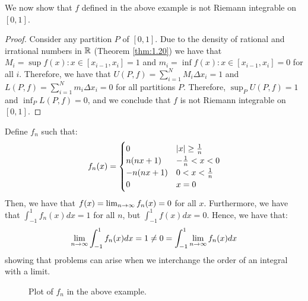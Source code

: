 \noindent We now show that $f$ defined in the above example is not Riemann integrable on $[0, 1]$.

\begin{proof}
    Consider any partition $P$ of $[0, 1]$. Due to the density of rational and irrational numbers in $\mathbb{R}$ (Theorem \ref{thm:1.20}) we have that $M_i = \sup{f(x): x \in [x_{i-1}, x_i]} = 1$ and $m_i = \inf{f(x): x \in [x_{i-1}, x_i]} = 0$ for all $i$. Therefore, we have that $U(P, f) = \sum_{i=1}^N M_i \Delta x_i = 1$ and $L(P, f) = \sum_{i=1}^N m_i \Delta x_i = 0$ for all partitions $P$. Therefore, $\sup_P U(P, f) = 1$ and $\inf_P L(P, f) = 0$, and we conclude that $f$ is not Riemann integrable on $[0, 1]$.
\end{proof}


\begin{nexample}{}{}
    Define $f_n$ such that:
    \begin{align*}
        f_n(x) = \begin{cases}
            0 & \abs{x} \geq \frac{1}{n}
            \\ n(nx+1) & -\frac{1}{n} < x < 0
            \\ -n(nx+1) & 0 < x < \frac{1}{n}
            \\ 0 & x = 0
        \end{cases}
    \end{align*}
    Then, we have that $f(x) = \lim_{n \rightarrow \infty} f_n(x) = 0$ for all $x$.  Furthermore, we have that $\int_{-1}^1 f_n(x)dx = 1$ for all $n$, but $\int_{-1}^1 f(x)dx = 0$. Hence, we have that:
    \begin{align*}
        \lim_{n \rightarrow \infty} \int_{-1}^1 f_n(x)dx = 1 \neq 0 = \int_{-1}^1 \lim_{n \rightarrow \infty} f_n(x) dx
    \end{align*}
    showing that problems can arise when we interchange the order of an integral with a limit.
\end{nexample}

\begin{figure}[htbp]
    \centering
    
    \caption{Plot of $f_n$ in the above example.}
    \label{fig39}
\end{figure}

